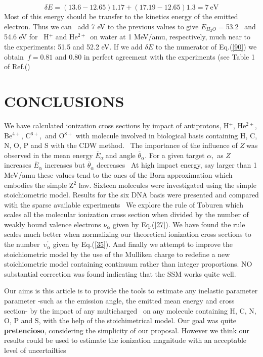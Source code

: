 \documentclass[preprint,showpacs,pra]{revtex4-1}
\begin{document}
\begin{equation}
\delta E=(13.6-12.65)1.17+(17.19-12.65)1.3=7\ \text{eV}  \label{80}
\end{equation}%
Most of this energy should be transfer to the kinetics energy of the emitted
electron. Thus we can \ add 7 eV to the previous values to give $\overline{E}%
_{H_{2}O}=$53.2 \ and 54.6 eV for \ H$^{+}$ and He$^{2+~}$ on water at 1
MeV/amu, respectively, much near to the experiments: 51.5 and 52.2 eV. If we
add $\delta E$ to the numerator of Eq.(\ref{90}) we obtain\ $f=0.81$ and $%
0.80$ in perfect agreement with the experiments (see Table 1 of Ref.(\cite%
{pimblott2007})

\section{CONCLUSIONS}

We have calculated ionization cross sections by impact of antiprotons, H$^{+}
$, He$^{2+}$, Be$^{4+}$, C$^{6+}$,\ and O$^{8+}$ with molecule involved in
biological basis containing H, C, N, O, P and S with the CDW method. \ The
importance of the influence of $Z\ $was observed in the mean energy $%
\overline{E}_{\alpha }\ $and angle $\overline{\theta }_{\alpha }.$ For a
given target $\alpha ,$ as $Z$ increases $\overline{E}_{\alpha }$ increases
but $\overline{\theta }_{\alpha }$ decreases \ At high impact energy, say
larger than 1 MeV/amu these values tend to the ones of the Born
approximation which embodies the simple Z$^{2}$ law. Sixteen molecules were
investigated using the simple stoichiometric model. Results for the six DNA
basis were presented and compared with the sparse available experiments \ We
explore the rule of Toburen which scales all the molecular ionization cross
section when divided by the number of weakly bound valence electrons $\nu
_{\alpha }$ given by Eq.(\ref{27})$.$ We have found the rule scales much
better when normalizing our theoretical ionization cross sections to the
number\ $\upsilon _{\alpha }^{\prime }$ given by Eq.(\ref{35}). And finally
we attempt to improve the stoichiometric model by the use of the Mulliken
charge to redefine a new stoichiometric model containing continuum rather
than integer proportions. NO substantial correction was found indicating
that the SSM works quite well.

Our aims is this article is to provide the tools to estimate any inelastic
parameter parameter -such as the emission angle, the emitted mean energy and
cross section- by the impact of any multicharged \ on any molecule
containing H, C, N, O, P and S, with the help of the stoichimetrical model.
Our goal was quite \textbf{pretencioso}, considering the simplicity of our
proposal. However we think our results could be used to estimate the
ionization magnitude with an acceptable level of uncertailties
\end{document}
